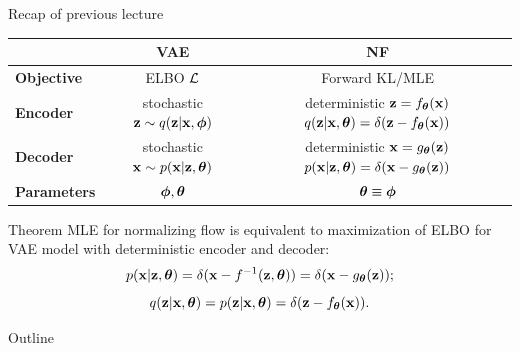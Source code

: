 

\begin{frame}
\titlepage
\end{frame}
\begin{frame}{Recap of previous lecture}
	\begin{table}[]
		\begin{tabular}{l|c|c}
			& \textbf{VAE} & \textbf{NF} \\ \hline
			\textbf{Objective} & ELBO $\mathcal{L}$ & Forward KL/MLE \\ \hline
			\textbf{Encoder} & \shortstack{stochastic \\ $\mathbf{z} \sim q (\mathbf{z} | \mathbf{x}, \boldsymbol{\phi})$} &  \shortstack{\\ deterministic \\ $\mathbf{z} = f_{\boldsymbol{\theta}}(\mathbf{x})$ \\ $q(\mathbf{z} | \mathbf{x}, \boldsymbol{\theta}) = \delta(\mathbf{z} - f_{\boldsymbol{\theta}}(\mathbf{x}))$}  \\ \hline
			\textbf{Decoder} & \shortstack{stochastic \\ $\mathbf{x} \sim p (\mathbf{x} | \mathbf{z}, \boldsymbol{\theta})$} & \shortstack{\\ deterministic \\ $\mathbf{x} = g_{\boldsymbol{\theta}}(\mathbf{z})$ \\ $ p(\mathbf{x} | \mathbf{z}, \boldsymbol{\theta}) = \delta(\mathbf{x} - g_{\boldsymbol{\theta}}(\mathbf{z}))$} \\ \hline
			\textbf{Parameters}  & $\boldsymbol{\phi}, \boldsymbol{\theta}$ & $\boldsymbol{\theta} \equiv \boldsymbol{\phi}$\\ 
		\end{tabular}
	\end{table}
	\begin{block}{Theorem}
		MLE for normalizing flow is equivalent to maximization of ELBO for VAE model with deterministic encoder and decoder:
		\vspace{-0.3cm}
		\[
		p(\mathbf{x} | \mathbf{z}, \boldsymbol{\theta}) = \delta (\mathbf{x} - f^{-1}(\mathbf{z}, \boldsymbol{\theta})) = \delta (\mathbf{x} - g_{\boldsymbol{\theta}}(\mathbf{z}));
		\]
		\[
		q(\mathbf{z} | \mathbf{x}, \boldsymbol{\theta}) = p(\mathbf{z} | \mathbf{x}, \boldsymbol{\theta}) = \delta (\mathbf{z} - f_{\boldsymbol{\theta}}(\mathbf{x})).
		\]
	\end{block}
\end{frame}
\begin{frame}{Outline}
	\tableofcontents
\end{frame}

